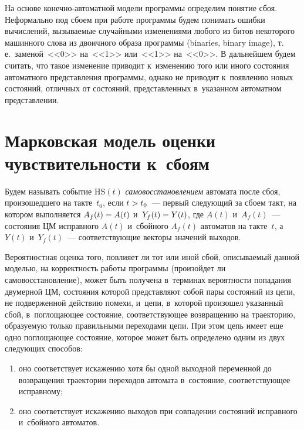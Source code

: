 \begin{multicols}{2}
     На основе ко\-неч\-но-ав\-то\-мат\-ной модели программы определим 
понятие сбоя. Неформально под сбоем при работе программы будем понимать 
ошибки вычислений, вызываемые случайными изменениями любого из битов 
некоторого машинного слова из двоичного образа программы (binaries, binary 
image), т.\,е.\ заменой~<<0>> на~<<1>> или~<<1>> на~<<0>>. В дальнейшем 
будем считать, что такое изменение приводит к~изменению того или иного 
состояния автоматного представления программы, однако не приводит 
к~появлению новых состояний, отличных от состояний, представленных 
в~указанном автоматном представлении.

\section{Марковская модель оценки чувствительности к~сбоям}

     Будем называть событие $\mathrm{HS}(t)$ \textit{са\-мо\-вос\-ста\-нов\-ле\-ни\-ем} автомата 
после сбоя, произошедшего на такте~$t_0$, если $t\hm>t_0$~--- первый 
следующий за сбоем такт, на котором выполняется $A_f(t)\hm=A(t)$ 
и~$Y_f(t)\hm=Y(t)$, где $A(t)$ и~$A_f(t)$~--- состояния ЦМ исправного 
$A(t)$ и~сбойного $A_f(t)$ автоматов на такте~$t$, а~$Y(t)$ и~$Y_f(t)$~--- 
соответствующие векторы значений выходов.
     
     Вероятностная оценка того, повлияет ли тот или иной сбой, описываемый 
данной моделью, на корректность работы программы (произойдет ли 
самовосстановление), может быть получена в~терминах вероятности попадания 
двумерной ЦМ, состояния которой представляют собой пары 
состояний из цепи, не подверженной действию помехи, и~цепи, в~которой 
произошел указанный сбой, в~поглощающее состояние, соответствующее 
возвращению на траекторию, образуемую только правильными переходами 
цепи. 
     При этом цепь имеет еще одно поглощающее состояние, которое может 
быть определено одним из двух следующих способов:
     \begin{enumerate}[(1)]
     \item оно соответствует искажению хотя бы одной выходной переменной 
до возвращения траектории переходов автомата в~состояние, соответствующее 
исправному;
     \item оно соответствует искажению выходов при совпадении состояний 
исправного и~сбойного автоматов.
     \end{enumerate}
     

\end{multicols}
